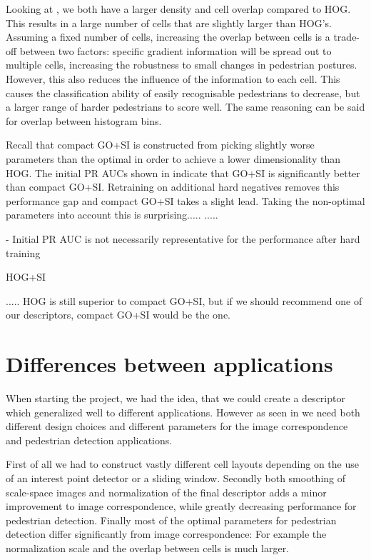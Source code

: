 \documentclass[thesis.tex]{subfiles}
\begin{document}
Looking at , we both have a larger density and cell overlap compared to HOG. This results in a large number of cells that are slightly larger than HOG's. Assuming a fixed number of cells, increasing the overlap between cells is a trade-off between two factors: specific gradient information will be spread out to multiple cells, increasing the robustness to small changes in pedestrian postures. However, this also reduces the influence of the information to each cell. This causes the classification ability of easily recognisable pedestrians to decrease, but a larger range of harder pedestrians to score well. The same reasoning can be said for overlap between histogram bins.

Recall that compact GO+SI is constructed from picking slightly worse parameters than the optimal in order to achieve a lower dimensionality than HOG. The initial PR AUCs shown in  indicate that GO+SI is significantly better than compact GO+SI. Retraining on additional hard negatives removes this performance gap and compact GO+SI takes a slight lead. Taking the non-optimal parameters into account this is surprising.....
.....

	- Initial PR AUC is not necessarily representative for the performance after hard training

HOG+SI

.....
HOG is still superior to compact GO+SI, but if we should recommend one of our descriptors, compact GO+SI would be the one.

\section{Differences between applications}
When starting the project, we had the idea, that we could create a descriptor which generalized well to different applications. However as seen in  we need both different design choices and different parameters for the image correspondence and pedestrian detection applications.

First of all we had to construct vastly different cell layouts depending on the use of an interest point detector or a sliding window. Secondly both smoothing of scale-space images and normalization of the final descriptor adds a minor improvement to image correspondence, while greatly decreasing performance for pedestrian detection. Finally most of the optimal parameters for pedestrian detection differ significantly from image correspondence: For example the normalization scale and the overlap between cells is much larger.
\end{document}
